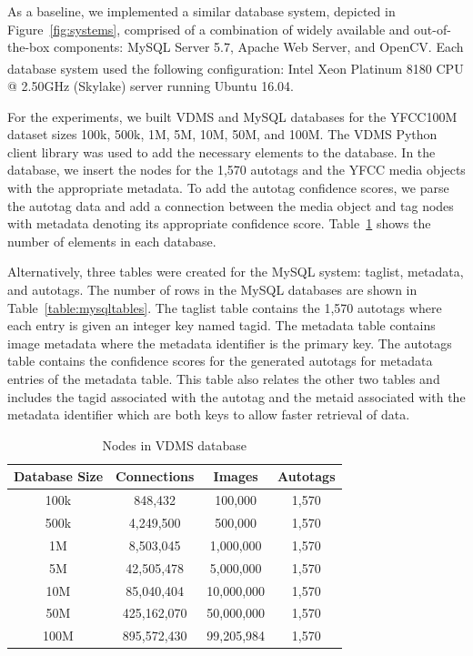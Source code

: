 As a baseline, we implemented a similar database system, depicted in Figure~\ref{fig:systems}, comprised of a combination of widely available and out-of-the-box components: MySQL Server 5.7, Apache Web Server, and OpenCV.  Each database system used the following configuration: Intel\textsuperscript{\textregistered} Xeon\textsuperscript{\textregistered} Platinum 8180 CPU @ 2.50GHz (Skylake) server running Ubuntu 16.04.  
 
For the experiments, we built VDMS and MySQL databases for the YFCC100M dataset sizes 100k, 500k, 1M, 5M, 10M, 50M, and 100M. The VDMS Python client library was used to add the necessary elements to the database.  In the database, we insert the nodes for the 1,570 autotags and the YFCC media objects with the appropriate metadata. To add the autotag confidence scores, we parse the autotag data and add a connection between the media object and tag nodes with metadata denoting its appropriate confidence score. Table~\ref{table:vdmsnodes} shows the number of elements in each database.  

Alternatively, three tables were created for the MySQL system: taglist, metadata, and autotags.  The number of rows in the MySQL databases are shown in Table~\ref{table:mysqltables}. The taglist table contains the 1,570 autotags where each entry is given an integer key named tagid.  The metadata table contains image metadata where the metadata identifier is the primary key. The autotags table contains the confidence scores for the generated autotags for metadata entries of the metadata table.  This table also relates the other two tables and includes the tagid associated with the autotag and the metaid associated with the metadata identifier which are both keys to allow faster retrieval of data. 

\begin{table}[h]
\caption{Nodes in VDMS database}
\centering
\begin{tabular}{c c c c}
\hline\hline
Database Size & Connections & Images & Autotags\\
\hline
100k & 848,432 & 100,000 & 1,570\\
500k & 4,249,500 & 500,000 & 1,570\\
1M & 8,503,045 & 1,000,000 & 1,570\\
5M & 42,505,478 & 5,000,000 & 1,570\\
10M & 85,040,404 & 10,000,000 & 1,570\\
50M & 425,162,070 & 50,000,000 & 1,570\\
100M & 895,572,430 & 99,205,984 & 1,570\\
\hline
\end{tabular}
\label{table:vdmsnodes}
\end{table}

